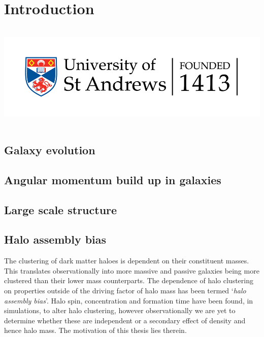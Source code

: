 \chapter{Introduction}
\vspace{-5in}
\includegraphics[height=2.0in]{thesis/latex/st_a_logo_.png}
\vspace{3in}

\label{ch:intro}
\section{Galaxy evolution}
\section{Angular momentum build up in galaxies}
\section{Large scale structure}
\section{Halo assembly bias}
The clustering of dark matter haloes is dependent on their constituent masses. This translates observationally into more massive and passive galaxies being more clustered than their lower mass counterparts. The dependence of halo clustering on properties outside of the driving factor of halo mass has been termed `\textit{halo assembly bias}'. Halo spin, concentration and formation time have been found, in simulations, to alter halo clustering, however observationally we are yet to determine whether these are independent or a secondary effect of density and hence halo mass. The motivation of this thesis lies therein. 